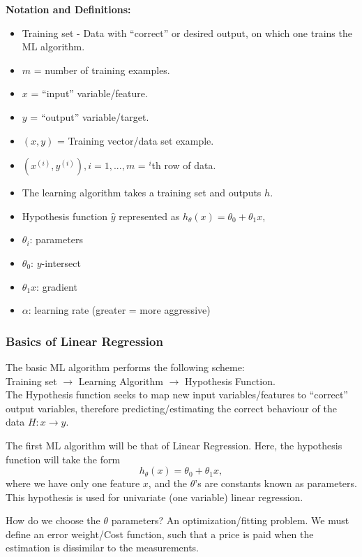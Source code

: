 \documentclass[12pt] {article}
\newcommand{\ind}{{(i)}}
\begin{document}
  \textbf{Notation and Definitions:}
  \vspace{-1em}
  \begin{itemize}
    \item Training set - Data with ``correct'' or desired output, on which one trains the ML algorithm. 
    \item $m$ = number of training examples.
    \item $x$ = ``input'' variable/feature.
    \item $y$ = ``output'' variable/target.
    \item $(x, y)$ = Training vector/data set example.
    \item $(x^\ind, y^\ind), i=1,...,m$ = $^i$th row of data.
    \item The learning algorithm takes a training set and outputs $h$.
    \item Hypothesis function $\hat{y}$ represented as $h_\theta(x) = 
          \theta_0 + \theta_1x$,
    \item $\theta_i$: parameters
    \item $\theta_0$: $y$-intersect
    \item $\theta_1x$: gradient
    \item $\alpha$: learning rate (greater = more aggressive)
  \end{itemize}

\subsubsection{Basics of Linear Regression}

The basic ML algorithm performs the following scheme: \\
Training set $\to$ Learning Algorithm $\to$ Hypothesis Function.\\

The Hypothesis function seeks to map new input variables/features to ``correct'' output variables, therefore predicting/estimating the correct behaviour of the data $H:x\to y$.

The first ML algorithm will be that of Linear Regression.
Here, the hypothesis function will take the form
\begin{equation}
  h_\theta (x) = \theta_0 + \theta_1 x,
\end{equation}
where we have only one feature $x$, and the $\theta$'s are constants known as parameters.
This hypothesis is used for univariate (one variable) linear regression.

How do we choose the $\theta$ parameters? An optimization/fitting problem. We must define an error weight/Cost function, such that a price is paid when the estimation is dissimilar to the measurements.
\end{document}
